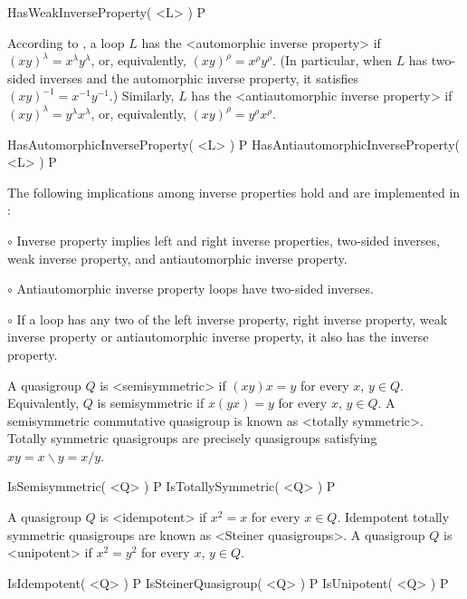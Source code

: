\>HasWeakInverseProperty( <L> ) P

According to \cite{Ar}, a loop $L$ has the <automorphic inverse
property> if $(xy)^\lambda = x^\lambda
y^\lambda$, or, equivalently, $(xy)^\rho = x^\rho y^\rho$. (In particular, when
$L$ has two-sided inverses and the automorphic inverse property, it satisfies
$(xy)^{-1}=x^{-1}y^{-1}$.) Similarly, $L$ has the <antiautomorphic inverse
property> if $(xy)^\lambda=y^\lambda
x^\lambda$, or, equivalently, $(xy)^\rho = y^\rho x^\rho$.

\>HasAutomorphicInverseProperty( <L> ) P
\>HasAntiautomorphicInverseProperty( <L> ) P

The following implications among inverse properties hold and are
implemented in {\LOOPS}:
\beginlist%
\item{$\circ$}
    Inverse property implies left and right inverse properties,
    two-sided inverses, weak inverse property, and antiautomorphic
    inverse property.
\item{$\circ$}
    Antiautomorphic inverse property loops have two-sided inverses.
\item{$\circ$}
    If a loop has any two of the left inverse property, right inverse property,
    weak inverse property or antiautomorphic inverse property, it also has
    the inverse property.
\endlist


A quasigroup $Q$ is <semisymmetric> if
$(xy)x=y$ for every $x$, $y\in Q$. Equivalently, $Q$ is semisymmetric if
$x(yx)=y$ for every $x$, $y\in Q$. A semisymmetric commutative quasigroup is
known as <totally symmetric>. Totally
symmetric quasigroups are precisely quasigroups satisfying $xy=x\backslash y =
x/y$.

\>IsSemisymmetric( <Q> ) P
\>IsTotallySymmetric( <Q> ) P

A quasigroup $Q$ is <idempotent> if $x^2=x$ for
every $x\in Q$. Idempotent totally symmetric quasigroups are known as <Steiner
quasigroups>. A quasigroup $Q$ is
<unipotent> if $x^2=y^2$ for every $x$, $y\in Q$.

\>IsIdempotent( <Q> ) P
\>IsSteinerQuasigroup( <Q> ) P
\>IsUnipotent( <Q> ) P

